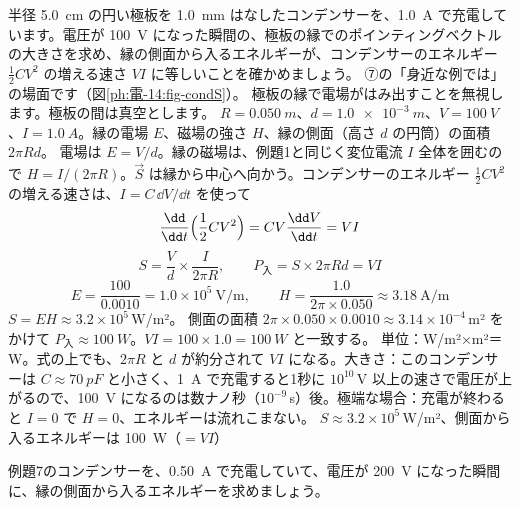 \begin{phreidai}[コンデンサーに横から入るエネルギー]
\label{ph:電-14:ex7}半径 \qty{5.0}{cm} の円い極板を \qty{1.0}{mm} はなしたコンデンサーを、\qty{1.0}{A} で充電しています。電圧が \qty{100}{V} になった瞬間の、極板の縁でのポインティングベクトルの大きさを求め、縁の側面から入るエネルギーが、コンデンサーのエネルギー $\tfrac12CV^2$ の増える速さ $VI$ に等しいことを確かめましょう。
\phbamen
⑦の「身近な例では」の場面です（図\ref{ph:電-14:fig-condS}）。
\phmushi
極板の縁で電場がはみ出すことを無視します。極板の間は真空とします。
\phzu
$R=\qty{0.050}{m}$、$d=\qty{1.0e-3}{m}$、$V=\qty{100}{V}$、$I=\qty{1.0}{A}$。縁の電場 $E$、磁場の強さ $H$、縁の側面（高さ $d$ の円筒）の面積 $2\pi Rd$。
\phriyu
電場は $E=V/d$。縁の磁場は、例題1と同じく変位電流 $I$ 全体を囲むので $H=I/(2\pi R)$。$\vec S$ は縁から中心へ向かう。コンデンサーのエネルギー $\tfrac12CV^2$ の増える速さは、$I=C\,\dd V/\dd t$ を使って
\[ \frac{\dd}{\dd t}\Bigl(\frac12CV^2\Bigr)=CV\frac{\dd V}{\dd t}=VI \]
\phtateru
\[ S=\frac{V}{d}\times\frac{I}{2\pi R},\qquad P_{\text{入}}=S\times2\pi Rd=VI \]
\phtoku
\[ E=\frac{100}{0.0010}=1.0\times10^5\ \mathrm{V/m},\qquad H=\frac{1.0}{2\pi\times0.050}\approx3.18\ \mathrm{A/m} \]
$S=EH\approx3.2\times10^5$\,W/m²。
側面の面積 $2\pi\times0.050\times0.0010\approx3.14\times10^{-4}$\,m² をかけて $P_{\text{入}}\approx\qty{100}{W}$。$VI=100\times1.0=\qty{100}{W}$ と一致する。
\phtashikame
単位：W/m²×m²＝W。式の上でも、$2\pi R$ と $d$ が約分されて $VI$ になる。大きさ：このコンデンサーは $C\approx\qty{70}{pF}$ と小さく、\qty{1}{A} で充電すると1秒に $10^{10}$\,V 以上の速さで電圧が上がるので、\qty{100}{V} になるのは数ナノ秒（$10^{-9}$\,s）後。極端な場合：充電が終わると $I=0$ で $H=0$、エネルギーは流れこまない。
\kotae $S\approx3.2\times10^5$\,W/m²、側面から入るエネルギーは \qty{100}{W}（$=VI$）
\end{phreidai}
\begin{jibun}
例題7のコンデンサーを、\qty{0.50}{A} で充電していて、電圧が \qty{200}{V} になった瞬間に、縁の側面から入るエネルギーを求めましょう。
\end{jibun}

